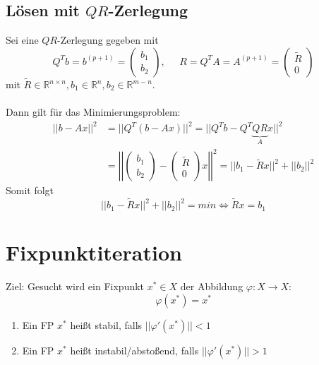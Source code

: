 \documentclass[4pt,a4paper]{scrartcl}
\begin{document}
\begin{multicols}{4}
\subsection{Lösen mit $QR$-Zerlegung}
Sei eine $QR$-Zerlegung gegeben mit
\begin{equation*}
Q^Tb=b^{(p+1)}=\begin{pmatrix}b_1 \\ b_2\end{pmatrix},\;\;\;\;\;R=Q^TA=A^{(p+1)}=\begin{pmatrix}\tilde{R} \\ 0\end{pmatrix}
\end{equation*}
mit $\tilde{R}\in\mathbb{R}^{n\times n},b_1\in\mathbb{R}^n,b_2\in\mathbb{R}^{m-n}$.\\\\
Dann gilt für das Minimierungsproblem:
\begin{equation*}
\begin{split}
||b-Ax||^2&=||Q^T(b-Ax)||^2=||Q^Tb-Q^T\underbrace{QR}_{A}x||^2\\
&=\left|\left|\begin{pmatrix}b_1 \\ b_2\end{pmatrix}-\begin{pmatrix}\tilde{R} \\ 0\end{pmatrix}x\right|\right|^2=||b_1-\tilde{R}x||^2+||b_2||^2
\end{split}
\end{equation*}
Somit folgt
\begin{equation*}
||b_1-\tilde{R}x||^2+||b_2||^2=min\Leftrightarrow \tilde{R}x=b_1
\end{equation*}

\section{Fixpunktiteration}
Ziel: Gesucht wird ein Fixpunkt $x^*\in X$ der Abbildung $\varphi:X\rightarrow X$:
\begin{equation*}
\varphi(x^*)=x^*
\end{equation*}
\begin{enumerate}[label=$\bullet$]
\item Ein FP $x^*$ heißt stabil, falls $||\varphi'(x^*)||<1$
\item Ein FP $x^*$ heißt instabil/abstoßend, falls $||\varphi'(x^*)||>1$
\end{enumerate}


\end{multicols}
\end{document}
